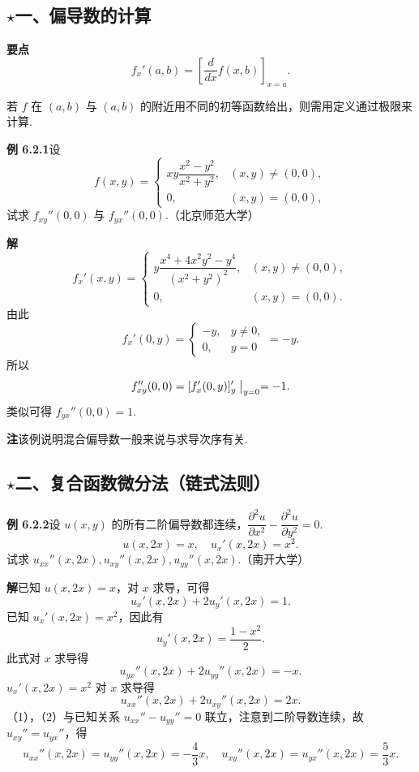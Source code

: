 \documentclass[UTF8, 12pt, fontset=fandol, oneside]{ctexart}
\begin{document}
\subsection*{\ensuremath{\star}一、偏导数的计算}

\noindent\textbf{要点}\quad
\[
  f_x'(a,b)=\left[\frac{d}{dx}f(x,b)\right]_{x=a}.
\]

若 $f$ 在 $(a,b)$ 与 $(a,b)$ 的附近用不同的初等函数给出，则需用定义通过极限来计算.

\noindent\textbf{例 6.2.1}\quad 设
\[
  f(x,y)=
  \begin{cases}
  xy\dfrac{x^2-y^2}{x^2+y^2}, & (x,y)\ne(0,0),\\
  0, & (x,y)=(0,0),
  \end{cases}
\]
试求 $f_{xy}''(0,0)$ 与 $f_{yx}''(0,0)$.（北京师范大学）

\noindent\textbf{解}\quad
\[
  f_x'(x,y)=
  \begin{cases}
  y\dfrac{x^4+4x^2y^2-y^4}{(x^2+y^2)^2}, & (x,y)\ne(0,0),\\
  0, & (x,y)=(0,0).
  \end{cases}
\]
由此
\[
  f_x'(0,y)=
  \begin{cases}
  -y, & y\ne0,\\
  0, & y=0
  \end{cases}
  =-y.
\]
所以
\[
  f_{xy}''(0,0)=[f_x'(0,y)]_y'\bigm|_{y=0}=-1.
\]
类似可得 $f_{yx}''(0,0)=1$.

\noindent\textbf{注}\quad 该例说明混合偏导数一般来说与求导次序有关.

\subsection*{\ensuremath{\star}二、复合函数微分法（链式法则）}

\noindent\textbf{例 6.2.2}\quad 设 $u(x,y)$ 的所有二阶偏导数都连续，$\dfrac{\partial^2u}{\partial x^2}-\dfrac{\partial^2u}{\partial y^2}=0$.
\[
  u(x,2x)=x,\quad u_x'(x,2x)=x^2.
\]
试求 $u_{xx}''(x,2x),u_{xy}''(x,2x),u_{yy}''(x,2x)$.（南开大学）

\noindent\textbf{解}\quad 已知 $u(x,2x)=x$，对 $x$ 求导，可得
\[
  u_x'(x,2x)+2u_y'(x,2x)=1.
\]
已知 $u_x'(x,2x)=x^2$，因此有
\[
  u_y'(x,2x)=\frac{1-x^2}{2}.
\]
此式对 $x$ 求导得
\[
  u_{yx}''(x,2x)+2u_{yy}''(x,2x)=-x. \tag{1}
\]
$u_x'(x,2x)=x^2$ 对 $x$ 求导得
\[
  u_{xx}''(x,2x)+2u_{xy}''(x,2x)=2x. \tag{2}
\]
（1），（2）与已知关系 $u_{xx}''-u_{yy}''=0$ 联立，注意到二阶导数连续，故 $u_{xy}''=u_{yx}''$，得
\[
  u_{xx}''(x,2x)=u_{yy}''(x,2x)=-\frac43x,\quad
  u_{xy}''(x,2x)=u_{yx}''(x,2x)=\frac53x.
\]
\end{document}
